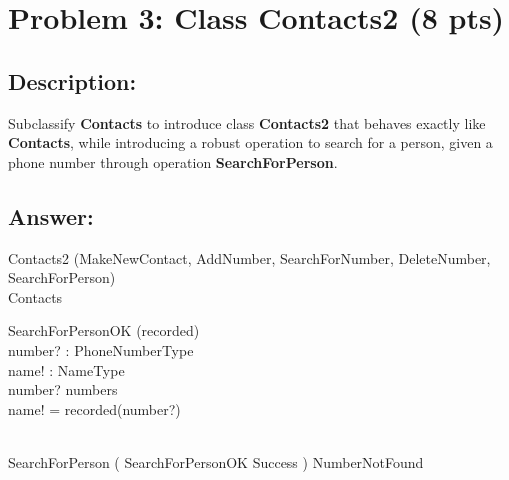 \newpage
\section{Problem 3: Class Contacts2 (8 pts)}

\subsection{Description:}
Subclassify \textbf{Contacts} to introduce class \textbf{Contacts2} that behaves exactly like \textbf{Contacts},
while introducing a robust operation to search for a person, given a phone number through
operation \textbf{SearchForPerson}.

\subsection{Answer:}

\begin{class}{Contacts2}
\also
\upharpoonright (MakeNewContact, AddNumber, SearchForNumber, DeleteNumber,\\ SearchForPerson) \\
Contacts\\

\begin{op}{SearchForPersonOK}
\Xi (recorded) \\
number? : PhoneNumberType \\
name! : NameType\\
\ST
number? \in numbers\\
name! = recorded(number?)
\end{op}\\
\also
SearchForPerson \sdef ( SearchForPersonOK \land Success ) \oplus NumberNotFound\\
\end{class}
